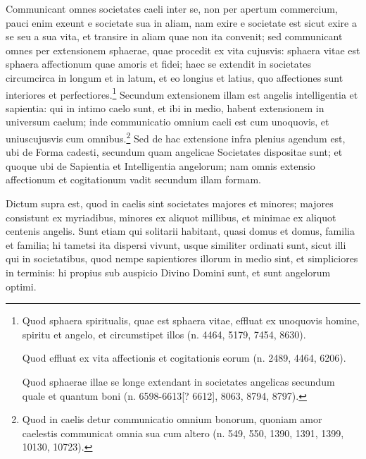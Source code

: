 \begin{topic}{49}
    Communicant omnes societates caeli inter se, non per apertum commercium, pauci enim exeunt e societate sua in aliam,
    nam exire e societate est sicut exire a se seu a sua vita, et transire in aliam quae non ita convenit; sed
    communicant omnes per extensionem sphaerae, quae procedit ex vita cujusvis: sphaera vitae est sphaera affectionum
    quae amoris et fidei; haec se extendit in societates circumcirca in longum et in latum, et eo longius et latius, quo
    affectiones sunt interiores et perfectiores.\footnote{Quod sphaera spiritualis, quae est sphaera vitae, effluat ex
    unoquovis homine, spiritu et angelo, et circumstipet illos (n. 4464, 5179, 7454, 8630).

    Quod effluat ex vita affectionis et cogitationis eorum (n. 2489, 4464, 6206).

    Quod sphaerae illae se longe extendant in societates angelicas secundum quale et quantum boni (n. 6598-6613[? 6612],
    8063, 8794, 8797).}
    Secundum extensionem illam est angelis intelligentia et sapientia: qui in intimo caelo sunt, et ibi in medio, habent
    extensionem in universum caelum; inde communicatio omnium caeli est cum unoquovis, et uniuscujusvis cum
    omnibus.\footnote{Quod in caelis detur communicatio omnium bonorum, quoniam amor caelestis communicat omnia sua cum
    altero (n. 549, 550, 1390, 1391, 1399, 10130, 10723).}
    Sed de hac extensione infra plenius agendum est, ubi de Forma cadesti, secundum quam angelicae Societates dispositae
    sunt; et quoque ubi de Sapientia et Intelligentia angelorum; nam omnis extensio affectionum et cogitationum vadit
    secundum illam formam.
\end{topic}

\begin{topic}{50}
    Dictum supra est, quod in caelis sint societates majores et minores; majores consistunt ex myriadibus, minores ex
    aliquot millibus, et minimae ex aliquot centenis angelis.
    Sunt etiam qui solitarii habitant, quasi domus et domus, familia et familia; hi tametsi ita dispersi vivunt, usque
    similiter ordinati sunt, sicut illi qui in societatibus, quod nempe sapientiores illorum in medio sint, et
    simpliciores in terminis: hi propius sub auspicio Divino Domini sunt, et sunt angelorum optimi.
\end{topic}
